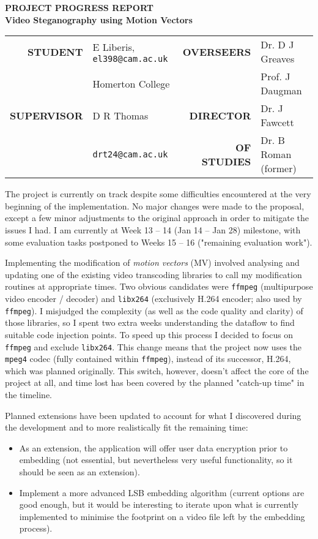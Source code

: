 \documentclass[11pt,british,usenames,dvipsnames,hypens,final]{scrartcl}
\numberwithin{equation}{section}
\numberwithin{figure}{section}
\newcommand{\textsbc}[1]{\sffamily \textsc{\textbf{#1}}}
\begin{document}
{%
\centering
\textsbc{PROJECT PROGRESS REPORT} \\
\huge \sffamily \textbf{Video Steganography using Motion Vectors}
\par\bigskip
}

{\centering
\begin{tabular}{rlrl}
\textsbc{STUDENT} & E Liberis, \texttt{el398@cam.ac.uk} & \textsbc{OVERSEERS} & Dr. D J Greaves\\
                  & Homerton College                    &                     & Prof. J Daugman\\[4pt]
\textsbc{SUPERVISOR} & D R Thomas               & \textsbc{DIRECTOR}   & Dr. J Fawcett\\
                     & \texttt{drt24@cam.ac.uk} & \textsbc{OF STUDIES} & Dr. B Roman (former)
\end{tabular}
\par\bigskip
}

The project is currently on track despite some difficulties encountered at the very beginning of the implementation. No major changes were made to the proposal, except a few minor adjustments to the original approach in order to mitigate the issues I had. I am currently at Week 13 -- 14 (Jan 14 -- Jan 28) milestone, with some evaluation tasks postponed to Weeks 15 -- 16 ("remaining evaluation work").

Implementing the modification of \emph{motion vectors} (MV) involved analysing and updating one of the existing video transcoding libraries to call my modification routines at appropriate times. Two obvious candidates were \texttt{ffmpeg} (multipurpose video encoder / decoder) and \texttt{libx264} (exclusively H.264 encoder; also used by \texttt{ffmpeg}). I misjudged the complexity (as well as the code quality and clarity) of those libraries, so I spent two extra weeks understanding the dataflow to find suitable code injection points. To speed up this process I decided to focus on \texttt{ffmpeg} and exclude \texttt{libx264}. This change means that the project now uses the  \texttt{mpeg4} codec (fully contained within \texttt{ffmpeg}), instead of its successor, H.264, which was planned originally. This switch, however, doesn't affect the core of the project at all, and time lost has been covered by the planned "catch-up time" in the timeline.

Planned extensions have been updated to account for what I discovered during the development and to more realistically fit the remaining time:
\begin{itemize}
\item As an extension, the application will offer user data encryption prior to embedding (not essential, but nevertheless very useful functionality, so it should be seen as an extension).
\item Implement a more advanced LSB embedding algorithm (current options are good enough, but it would be interesting to iterate upon what is currently implemented to minimise the footprint on a video file left by the embedding process).
\end{itemize}
\end{document}
